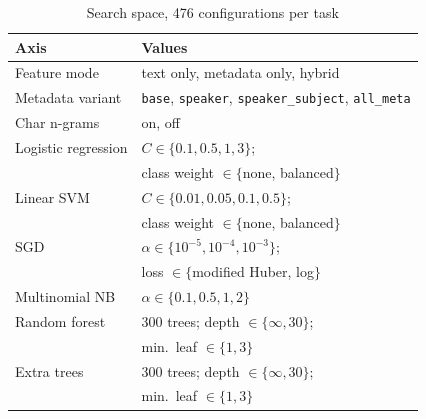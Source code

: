 \begin{table}[t]
\caption{Search space, 476 configurations per task}
\label{tab:grid}
\centering
\footnotesize
\begin{tabular}{@{}ll@{}}
\toprule
Axis & Values \\
\midrule
Feature mode & text only, metadata only, hybrid \\
Metadata variant & \texttt{base}, \texttt{speaker},
                   \texttt{speaker\_subject}, \texttt{all\_meta} \\
Char n-grams & on, off \\
\midrule
Logistic regression & $C \in \{0.1, 0.5, 1, 3\}$; \\
                    & class weight $\in \{$none, balanced$\}$ \\
Linear SVM & $C \in \{0.01, 0.05, 0.1, 0.5\}$; \\
           & class weight $\in \{$none, balanced$\}$ \\
SGD        & $\alpha \in \{10^{-5},10^{-4},10^{-3}\}$; \\
           & loss $\in \{$modified Huber, log$\}$ \\
Multinomial NB & $\alpha \in \{0.1, 0.5, 1, 2\}$ \\
Random forest  & 300 trees; depth $\in \{\infty, 30\}$; \\
               & min.\ leaf $\in \{1,3\}$ \\
Extra trees    & 300 trees; depth $\in \{\infty, 30\}$; \\
               & min.\ leaf $\in \{1,3\}$ \\
\bottomrule
\end{tabular}
\end{table}
